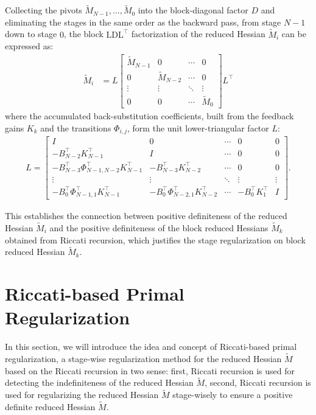 \documentclass[class=scrbook, crop=false]{standalone}
\begin{document}
Collecting the pivots $\tilde{M}_{N-1}, \dots, \tilde{M}_0$ into the block-diagonal factor $D$ and eliminating the stages in the same order as the backward pass, 
from stage $N-1$ down to stage $0$, the block $\mathrm{LD}\mathrm{L}^\top$ factorization of the reduced Hessian $\tilde{M}_i$ can be expressed as:
\begin{align*}
    \tilde{M}_i &= L
    \begin{bmatrix}
    \tilde{M}_{N-1} & 0 & \cdots & 0 \\
    0 & \tilde{M}_{N-2} & \cdots & 0 \\
    \vdots & \vdots & \ddots & \vdots \\
    0 & 0 & \cdots & \tilde{M}_{0}
    \end{bmatrix}
    L^\top
\end{align*}
where the accumulated back-substitution coefficients, built from the feedback gains $K_k$ and the transitions $\Phi_{i, j}$, form the unit lower-triangular factor $L$:
\begin{align*}
    L = 
    \begin{bmatrix}
    I & 0 & \cdots & 0 & 0 \\
    -B_{N-2}^\top K_{N-1}^\top & I & \cdots & 0 & 0 \\
    -B_{N-3}^\top \Phi_{N-1, N-2}^\top K_{N-1}^\top & -B_{N-3}^\top K_{N-2}^\top & \cdots & 0 & 0 \\
    \vdots & \vdots & \ddots & \vdots & \vdots \\
    -B_0^\top \Phi_{N-1, 1}^\top K_{N-1}^\top & -B_0^\top \Phi_{N-2, 1}^\top K_{N-2}^\top & \cdots & -B_0^\top K_1^\top & I
    \end{bmatrix}.
\end{align*}

This establishes the connection between positive definiteness of the reduced Hessian $\tilde{M}_i$ and the positive definiteness of the block reduced Hessians $\tilde{M}_k$ obtained from Riccati recursion, 
which justifies the stage regularization on block reduced Hessian $\tilde{M}_k$.

\section{Riccati-based Primal Regularization}
\label{sec:riccati_primal_reg}
In this section, we will introduce the idea and concept of Riccati-based primal regularization, 
a stage-wise regularization method for the reduced Hessian $\tilde{M}$ based on the Riccati recursion in two sense:
first, Riccati recursion is used for detecting the indefiniteness of the reduced Hessian $\tilde{M}$,
second, Riccati recursion is used for regularizing the reduced Hessian $\tilde{M}$
stage-wisely to ensure a positive definite reduced Hessian $\tilde{M}$.
\end{document}

